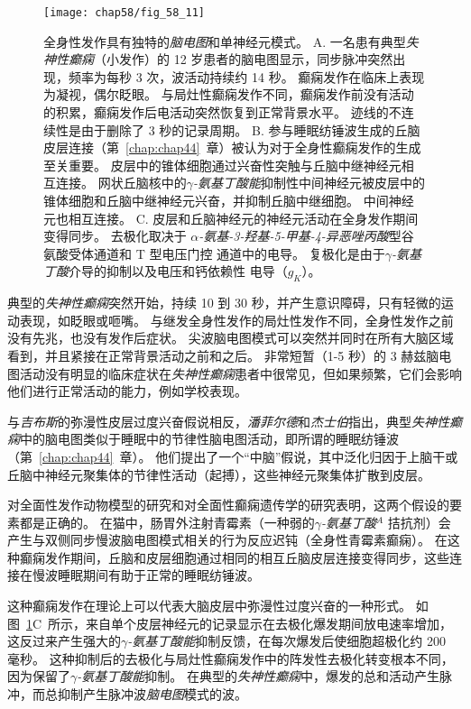 \begin{figure}[htbp]
	\centering
	\texttt{[image: chap58/fig\_58\_11]}
	\caption{全身性发作具有独特的\textit{脑电图}和单神经元模式。
		A. 一名患有典型\textit{失神性癫痫}（小发作）的 12 岁患者的脑电图显示，同步脉冲突然出现，频率为每秒 3 次，波活动持续约 14 秒。
		癫痫发作在临床上表现为凝视，偶尔眨眼。
		与局灶性癫痫发作不同，癫痫发作前没有活动的积累，癫痫发作后电活动突然恢复到正常背景水平。
		迹线的不连续性是由于删除了 3 秒的记录周期\cite{lothman1990seizures}。
		B. 参与睡眠纺锤波生成的丘脑皮层连接（第~\ref{chap:chap44}~章）被认为对于全身性癫痫发作的生成至关重要。
		皮层中的锥体细胞通过兴奋性突触与丘脑中继神经元相互连接。
		网状丘脑核中的\textit{$\gamma$-氨基丁酸能}抑制性中间神经元被皮层中的锥体细胞和丘脑中继神经元兴奋，并抑制丘脑中继细胞。
		中间神经元也相互连接。 
		C. 皮层和丘脑神经元的神经元活动在全身发作期间变得同步。
		去极化取决于 \textit{$\alpha$-氨基-3-羟基-5-甲基-4-异恶唑丙酸}型谷氨酸受体通道和 T 型电压门控  通道中的电导。
		复极化是由于\textit{$\gamma$-氨基丁酸}介导的抑制以及电压和钙依赖性  电导（$ g_K $）\cite{lothman1993neurobiology}。}
	\label{fig:58_11}
\end{figure}


典型的\textit{失神性癫痫}突然开始，持续 10 到 30 秒，并产生意识障碍，只有轻微的运动表现，如眨眼或咂嘴。
与继发全身性发作的局灶性发作不同，全身性发作之前没有先兆，也没有发作后症状。
尖波脑电图模式可以突然并同时在所有大脑区域看到，并且紧接在正常背景活动之前和之后。
非常短暂（1-5 秒）的 3 赫兹脑电图活动没有明显的临床症状在\textit{失神性癫痫}患者中很常见，但如果频繁，它们会影响他们进行正常活动的能力，例如学校表现。


与\textit{吉布斯}的弥漫性皮层过度兴奋假说相反，\textit{潘菲尔德}和\textit{杰士伯}指出，典型\textit{失神性癫痫}中的脑电图类似于睡眠中的节律性脑电图活动，即所谓的睡眠纺锤波（第~\ref{chap:chap44}~章）。
他们提出了一个“中脑”假说，其中泛化归因于上脑干或丘脑中神经元聚集体的节律性活动（起搏），这些神经元聚集体扩散到皮层。


对全面性发作动物模型的研究和对全面性癫痫遗传学的研究表明，这两个假设的要素都是正确的。
在猫中，肠胃外注射青霉素（一种弱的\textit{$\gamma$-氨基丁酸}$^A$ 拮抗剂）会产生与双侧同步慢波脑电图模式相关的行为反应迟钝（全身性青霉素癫痫）。
在这种癫痫发作期间，丘脑和皮层细胞通过相同的相互丘脑皮层连接变得同步，这些连接在慢波睡眠期间有助于正常的睡眠纺锤波。


这种癫痫发作在理论上可以代表大脑皮层中弥漫性过度兴奋的一种形式。
如图~\ref{fig:58_11}C~所示，来自单个皮层神经元的记录显示在去极化爆发期间放电速率增加，这反过来产生强大的\textit{$\gamma$-氨基丁酸能}抑制反馈，在每次爆发后使细胞超极化约 200 毫秒。
这种抑制后的去极化与局灶性癫痫发作中的阵发性去极化转变根本不同，因为保留了\textit{$\gamma$-氨基丁酸能}抑制。
在典型的\textit{失神性癫痫}中，爆发的总和活动产生脉冲，而总抑制产生脉冲波\textit{脑电图}模式的波。



